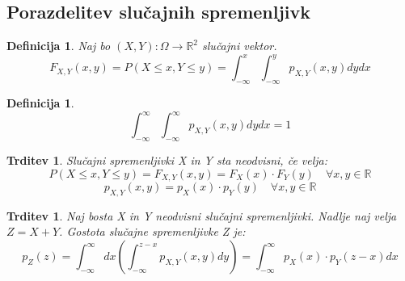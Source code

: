 \documentclass[11pt]{article}
\newtheorem{Trditev}[Izrek]{{\sc Trditev}}
\newtheorem{Definicija}[Izrek]{{\sc Definicija}}
\begin{document}
\subsection{Porazdelitev slučajnih spremenljivk}
\begin{Definicija}
	Naj bo $(X,Y) : \Omega \to \mathbb{R}^2$ slučajni vektor.
	$$F_{X,Y}(x,y) = P(X\le x, Y\le y) = \int_{-\infty}^{x}\int_{-\infty}^{y}{p_{X,Y}(x,y) dy dx}$$
\end{Definicija}
\begin{Definicija}
	$$\int_{-\infty}^{\infty}\int_{-\infty}^{\infty}{p_{X,Y}(x,y) dy dx} = 1$$
\end{Definicija}
\begin{Trditev}
	Slučajni spremenljivki X in Y sta neodvisni, če velja:
	$$P(X\le x, Y\le y) =F_{X,Y}(x,y) =F_X(x) \cdot F_Y(y) \quad \forall x,y\in \mathbb{R}$$
	$$p_{X,Y} (x,y) =p_X(x) \cdot p_Y(y) \quad \forall x,y\in \mathbb{R}$$
\end{Trditev}
\begin{Trditev}
	Naj bosta X in Y neodvisni slučajni spremenljivki. Nadlje naj velja $Z = X + Y$. Gostota slučajne spremenljivke Z je:
	$$p_Z(z) = \int_{-\infty}^{\infty}{dx}\left(\int_{-\infty}^{z-x}{p_{X,Y}(x,y) dy}\right) = \int_{-\infty}^{\infty}{p_X(x)\cdot p_Y(z-x)dx}$$
\end{Trditev}
\end{document}

